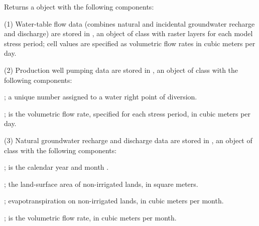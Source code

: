 \documentclass[a4paper]{book}
\begin{document}
%
\begin{Value}
Returns a  object with the following components:

(1) Water-table flow data (combines natural and incidental groundwater recharge and discharge) are stored in ,
an object of  class with raster layers for each model stress period;
cell values are specified as volumetric flow rates in cubic meters per day.

(2) Production well pumping data are stored in , an object of  class with the following components:
\begin{ldescription}
\item[\code{WMISNumber}] ; a unique number assigned to a water right point of diversion.
\item[\code{ss, 199501, ..., 201012}] ; is the volumetric flow rate, specified for each stress period, in cubic meters per day.

\end{ldescription}
(3) Natural groundwater recharge and discharge data are stored in , an object of  class with the following components:
\begin{ldescription}
\item[\code{YearMonth}] ; is the calendar year and month .
\item[\code{Area}] ; the land-surface area of non-irrigated lands, in square meters.
\item[\code{ET}] ; evapotranspiration on non-irrigated lands, in cubic meters per month.
\item[\code{Rech}] ; is the volumetric flow rate, in cubic meters per month.


\end{ldescription}
\end{Value}
\end{document}
